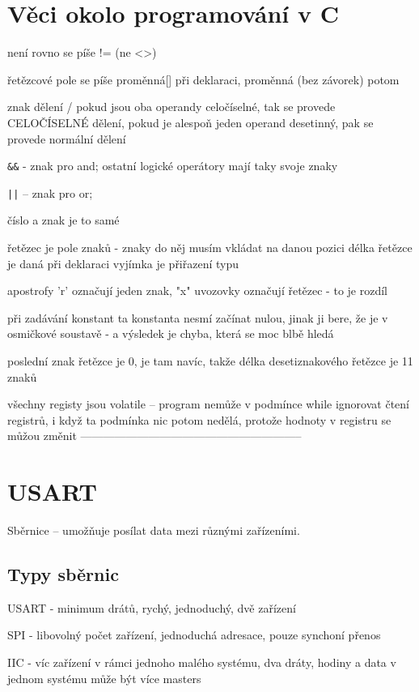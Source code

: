 
 \section{Věci okolo programování v C}
  
  není rovno se píše != (ne <>)
  
  řetězcové pole se píše proměnná[] při deklaraci, proměnná (bez závorek) potom 
  
 znak dělení /   pokud jsou oba operandy celočíselné, tak se provede CELOČÍSELNÉ dělení, pokud je alespoň jeden operand desetinný, pak se provede normální dělení
 
 \verb#&&# - znak pro and; ostatní logické operátory  mají taky svoje znaky 
 
 \verb#||# -- znak pro or;
 
 číslo a znak je to samé 
 
 řetězec je pole znaků - znaky do něj musím vkládat na danou pozici 
 délka řetězce je daná při deklaraci vyjímka je přiřazení typu   
 
 apostrofy 'r' označují jeden znak, "x" uvozovky označují řetězec - to je rozdíl 
 
 při zadávání konstant ta konstanta nesmí začínat nulou, jinak ji bere, že je v osmičkové soustavě - a výsledek je chyba, která se moc blbě hledá
 
poslední znak řetězce je 0, je tam navíc, takže délka desetiznakového řetězce je 11 znaků 

všechny registy jsou volatile -- program nemůže v podmínce while ignorovat čtení registrů, i když ta podmínka nic potom nedělá, protože hodnoty v registru se můžou změnit  
-----------------------------------------------------------

\section{USART}


Sběrnice -- umožňuje posílat data mezi různými zařízeními.   

\subsection{Typy sběrnic}

USART - minimum drátů, rychý, jednoduchý, dvě zařízení 

SPI - libovolný počet zařízení, jednoduchá adresace, pouze synchoní přenos 

IIC - víc zařízení v rámci jednoho malého systému, dva dráty, hodiny a data 
v jednom systému může být více masters 
 
